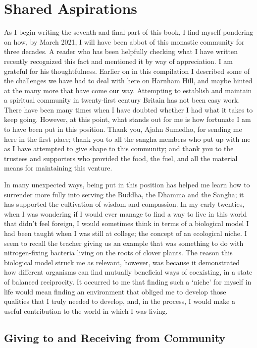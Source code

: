 \chapter{Shared Aspirations}

As I begin writing the seventh and final part of this book, I find
myself pondering on how, by March 2021, I will have been abbot of this
monastic community for three decades. A reader who has been helpfully
checking what I have written recently recognized this fact and mentioned
it by way of appreciation. I am grateful for his thoughtfulness. Earlier
on in this compilation I described some of the challenges we have had to
deal with here on Harnham Hill, and maybe hinted at the many more that
have come our way. Attempting to establish and maintain a spiritual
community in twenty-first century Britain has not been easy work. There
have been many times when I have doubted whether I had what it takes to
keep going. However, at this point, what stands out for me is how
fortunate I am to have been put in this position. Thank you, Ajahn
Sumedho, for sending me here in the first place; thank you to all the
sangha members who put up with me as I have attempted to give shape to
this community; and thank you to the trustees and supporters who
provided the food, the fuel, and all the material means for maintaining
this venture.

In many unexpected ways, being put in this position has helped me learn
how to surrender more fully into serving the Buddha, the Dhamma and the
Sangha; it has supported the cultivation of wisdom and compassion. In my
early twenties, when I was wondering if I would ever manage to find a
way to live in this world that didn't feel foreign, I would sometimes
think in terms of a biological model I had been taught when I was still
at college; the concept of an ecological niche. I seem to recall the
teacher giving us an example that was something to do with
nitrogen-fixing bacteria living on the roots of clover plants. The
reason this biological model struck me as relevant, however, was because
it demonstrated how different organisms can find mutually beneficial
ways of coexisting, in a state of balanced reciprocity. It occurred to
me that finding such a `niche' for myself in life would mean finding an
environment that obliged me to develop those qualities that I truly
needed to develop, and, in the process, I would make a useful
contribution to the world in which I was living.

\section{Giving to and Receiving from Community}


